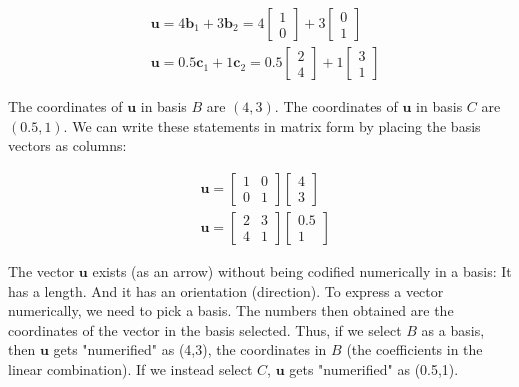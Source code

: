 \documentclass[main.tex]{subfiles}
\begin{document}
    $$
    \begin{aligned}
    &\mathbf{u}=4 \mathbf{b}_{1}+3 \mathbf{b}_{2}=4\left[\begin{array}{l}
    1 \\
    0
    \end{array}\right]+3\left[\begin{array}{l}
    0 \\
    1
    \end{array}\right] \\
    &\mathbf{u}=0.5 \mathbf{c}_{1}+1 \mathbf{c}_{2}=0.5\left[\begin{array}{l}
    2 \\
    4
    \end{array}\right]+1\left[\begin{array}{l}
    3 \\
    1
    \end{array}\right]
    \end{aligned}
    $$
    
    The coordinates of $\mathbf{u}$ in basis $B$ are $(4,3)$. The coordinates of $\mathbf{u}$ in basis $C$ are $(0.5,1)$. We can write these statements in matrix form by placing the basis vectors as columns:
    
    $$
    \begin{aligned}
    &\mathbf{u}=\left[\begin{array}{ll}
    1 & 0 \\
    0 & 1
    \end{array}\right]\left[\begin{array}{l}
    4 \\
    3
    \end{array}\right] \\
    &\mathbf{u}=\left[\begin{array}{ll}
    2 & 3 \\
    4 & 1
    \end{array}\right]\left[\begin{array}{r}
    0.5 \\
    1
    \end{array}\right]
    \end{aligned}
    $$
    
    The vector $\mathbf{u}$ exists (as an arrow) without being codified numerically in a basis: It has a length. And it has an orientation (direction). To express a vector numerically, we need to pick a basis. The numbers then obtained are the coordinates of the vector in the basis selected. Thus, if we select $B$ as a basis, then $\mathbf{u}$ gets "numerified" as (4,3), the coordinates in $B$ (the coefficients in the linear combination). If we instead select $C$, $\mathbf{u}$ gets "numerified" as (0.5,1).\\
    
\end{document}

